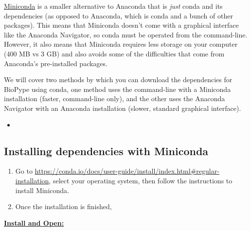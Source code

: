 \ul{Miniconda} is a smaller alternative to Anaconda that is \textit{just} conda and its dependencies (as opposed to Anaconda, which is conda and a bunch of other packages). This means that Miniconda doesn't come with a graphical interface like the Anaconda Navigator, so conda must be operated from the command-line. However, it also means that Miniconda requires less storage on your computer (400 MB vs 3 GB) and also avoids some of the difficulties that come from Anaconda's pre-installed packages. 

We will cover two methods by which you can download the dependencies for BioPype using conda, one method uses the command-line with a Miniconda installation (faster, command-line only), and the other uses the Anaconda Navigator with an Anaconda installation (slower, standard graphical interface). 
\begin{itemize}
\item {} 
\end{itemize}

\subsection*{Installing dependencies with Miniconda}
\begin{enumerate}
\item Go to \url{https://conda.io/docs/user-guide/install/index.html#regular-installation}, select your operating system, then follow the instructions to install Miniconda.


\item Once the installation is finished, 

\end{enumerate}



\textbf{\underline{Install and Open:}}

